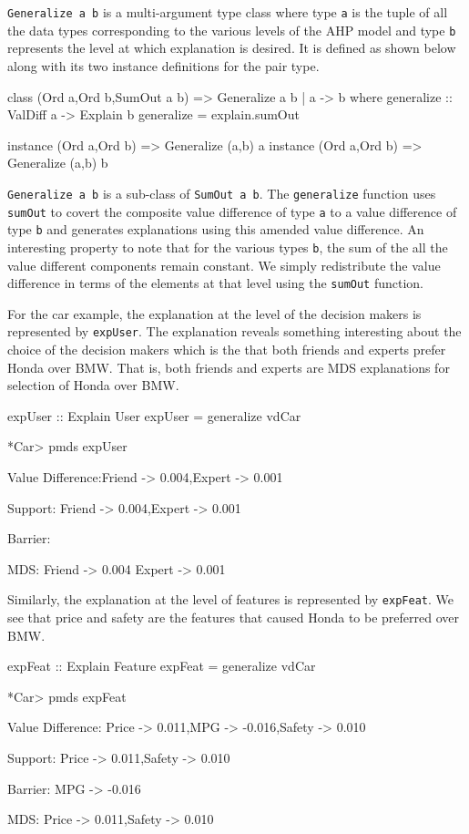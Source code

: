 \documentclass{jfp}
\newcommand{\prog}[1]{\texttt{#1}}
\begin{document}
\prog{Generalize a b} is a multi-argument type class where type \prog{a} is the tuple of all the data types corresponding to the various levels of the AHP model and type \prog{b} represents the level at which explanation is desired. It is defined as shown below along with its two instance definitions for the pair type. 
\begin{haskellcode}
class (Ord a,Ord b,SumOut a b) => Generalize a b | a -> b where
    generalize :: ValDiff a -> Explain b
    generalize = explain.sumOut

instance (Ord a,Ord b) => Generalize (a,b) a 
instance (Ord a,Ord b) => Generalize (a,b) b 
\end{haskellcode}
\prog{Generalize a b} is a sub-class of \prog{SumOut a b}. The \prog{generalize} function uses \prog{sumOut} to covert the composite value difference of type \prog{a} to a value difference of type \prog{b} and generates explanations using this amended value difference. An interesting property to note that for the various types \prog{b}, the sum of the all the value different components remain constant. We simply redistribute the value difference in terms of the elements at that level using the \prog{sumOut} function.

For the car example, the explanation at the level of the decision makers is represented by \prog{expUser}. The explanation reveals something interesting about the choice of the decision makers which is the that both friends and experts prefer Honda over BMW. That is, both friends and experts are MDS explanations for selection of Honda over BMW. 
\begin{haskellcode}
expUser :: Explain User
expUser = generalize vdCar

*Car> pmds expUser

Value Difference:{Friend -> 0.004,Expert -> 0.001}

Support: {Friend -> 0.004,Expert -> 0.001}

Barrier: {}

MDS: {Friend -> 0.004}
     {Expert -> 0.001}
\end{haskellcode}
Similarly, the explanation at the level of features is represented by \prog{expFeat}. We see that price and safety are the features that caused Honda to be preferred over BMW.
\begin{haskellcode}
expFeat :: Explain Feature
expFeat = generalize vdCar

*Car> pmds expFeat

Value Difference: {Price -> 0.011,MPG -> -0.016,Safety -> 0.010}

Support: {Price -> 0.011,Safety -> 0.010}

Barrier: {MPG -> -0.016}

MDS: {Price -> 0.011,Safety -> 0.010}
\end{haskellcode}
\end{document}
